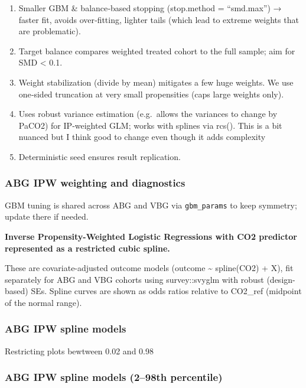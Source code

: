 \documentclass[
  11pt,
  letterpaper,
  DIV=11,
  numbers=noendperiod]{scrartcl}
\begin{document}
\begin{enumerate}
\def\labelenumi{\arabic{enumi}.}
\item
  Smaller GBM \& balance‑based stopping (stop.method = ``smd.max'') →
  faster fit, avoids over‑fitting, lighter tails (which lead to extreme
  weights that are problematic).
\item
  Target balance compares weighted treated cohort to the full sample;
  aim for \textbar SMD\textbar{} \textless{} 0.1.
\item
  Weight stabilization (divide by mean) mitigates a few huge weights. We
  use one‑sided truncation at very small propensities (caps large
  weights only).
\item
  Uses robust variance estimation (e.g.~allows the variances to change
  by PaCO2) for IP‑weighted GLM; works with splines via rcs(). This is a
  bit nuanced but I think good to change even though it adds complexity
\item
  Deterministic seed ensures result replication.
\end{enumerate}

\subsubsection{ABG IPW weighting and
diagnostics}\label{abg-ipw-weighting-and-diagnostics}

GBM tuning is shared across ABG and VBG via \texttt{gbm\_params} to keep
symmetry; update there if needed.

\textbf{Inverse Propensity-Weighted Logistic Regressions with CO2
predictor represented as a restricted cubic spline.}

These are covariate-adjusted outcome models (outcome \textasciitilde{}
spline(CO2) + X), fit separately for ABG and VBG cohorts using
survey::svyglm with robust (design-based) SEs. Spline curves are shown
as odds ratios relative to CO2\_ref (midpoint of the normal range).

\subsubsection{ABG IPW spline models}\label{abg-ipw-spline-models}

Restricting plots bewtween 0.02 and 0.98

\subsubsection{ABG IPW spline models (2--98th
percentile)}\label{abg-ipw-spline-models-298th-percentile}
\end{document}
